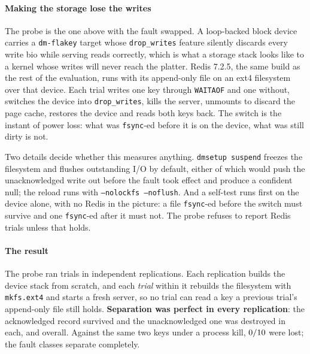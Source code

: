 \paragraph{Making the storage lose the writes} The probe is the one above with
the fault swapped. A loop-backed block device carries a \texttt{dm-flakey}
target whose \texttt{drop\_writes} feature silently discards every write bio
while serving reads correctly, which is what a storage stack looks like to a
kernel whose writes will never reach the platter. Redis 7.2.5, the same
build as the rest of the evaluation, runs with its append-only file on an
ext4 filesystem over that device. Each trial writes one key through
\texttt{WAITAOF} and one without, switches the device into
\texttt{drop\_writes}, kills the server, unmounts to discard the page cache,
restores the device and reads both keys back. The switch is the instant of
power loss: what was \texttt{fsync}-ed before it is on the device, what was
still dirty is not.

Two details decide whether this measures anything. \texttt{dmsetup suspend}
freezes the filesystem and flushes outstanding I/O by default, either of which
would push the unacknowledged write out before the fault took effect and
produce a confident null; the reload runs with \texttt{--nolockfs --noflush}.
And a self-test runs first on the device alone, with no Redis in the picture: a
file \texttt{fsync}-ed before the switch must survive and one \texttt{fsync}-ed
after it must not. The probe refuses to report Redis trials unless that holds.

\paragraph{The result} The probe ran \FlakeyN{} trials in \FlakeyReplications{}
independent replications. Each replication builds the device stack from
scratch, and each \emph{trial} within it rebuilds the filesystem with
\texttt{mkfs.ext4} and starts a fresh server, so no trial can read a key a
previous trial's append-only file still holds. \textbf{Separation was perfect in
every replication}: the acknowledged record survived
\FlakeyPerRepAckSurvived{} and the unacknowledged one was destroyed
\FlakeyPerRepUnackLost{} in each, \FlakeyAckSurvived{} and \FlakeyUnackLost{}
overall. Against the same two keys under a process kill,
$0/10{}$ were lost; the fault classes separate completely.

